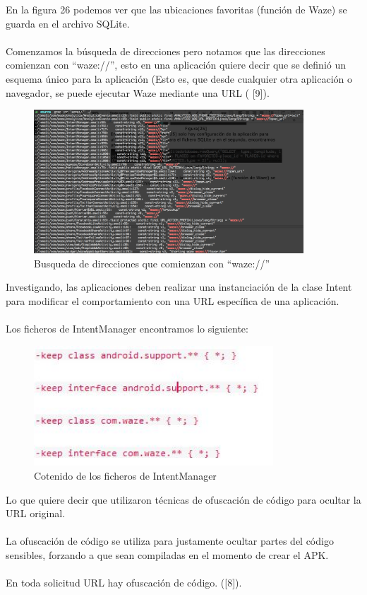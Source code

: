 En la figura 26 podemos ver que las ubicaciones favoritas (función de Waze) se guarda en el archivo SQLite.
\\\\
Comenzamos la búsqueda de direcciones pero notamos que las direcciones comienzan con “waze://”, esto en una aplicación quiere decir que se definió un esquema único para la aplicación (Esto es, que desde cualquier otra aplicación o navegador, se puede ejecutar Waze mediante una URL ( [9]).

    \begin{figure}[H]
  \begin{center}
    \includegraphics[width=0.9\textwidth]{imagenes/fig30.png}
    \caption{Busqueda de direcciones que comienzan con “waze://”}
  \end{center}
\end{figure}

Investigando, las aplicaciones deben realizar una instanciación de la clase Intent para modificar el comportamiento con una URL específica de una aplicación.
\\\\
Los ficheros de IntentManager encontramos lo siguiente:

    \begin{figure}[H]
  \begin{center}
    \includegraphics[width=0.8\textwidth]{imagenes/contFig30.JPG}
    \caption{Cotenido de los ficheros de IntentManager}
  \end{center}
\end{figure}


Lo que quiere decir que utilizaron técnicas de ofuscación de código para ocultar la URL original.
\\\\
La ofuscación de código se utiliza para justamente ocultar partes del código sensibles, forzando a que sean compiladas en el momento de crear el APK.
\\\\
En toda solicitud URL hay ofuscación de código. ([8]).